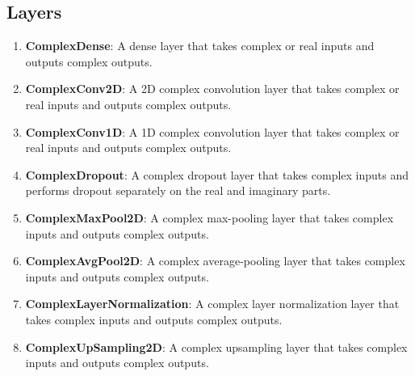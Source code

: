 \documentclass{article}
\begin{document}
\subsection{Layers}
\begin{enumerate}
  \item \textbf{ComplexDense}: A dense layer that takes complex or real inputs and outputs complex outputs.

  \item \textbf{ComplexConv2D}: A 2D complex convolution layer that takes complex or real inputs and outputs complex outputs.

  \item \textbf{ComplexConv1D}: A 1D complex convolution layer that takes complex or real inputs and outputs complex outputs.

  \item \textbf{ComplexDropout}: A complex dropout layer that takes complex inputs and performs dropout separately on the real and imaginary parts.

  \item \textbf{ComplexMaxPool2D}: A complex max-pooling layer that takes complex inputs and outputs complex outputs.

  \item \textbf{ComplexAvgPool2D}: A complex average-pooling layer that takes complex inputs and outputs complex outputs.

  \item \textbf{ComplexLayerNormalization}: A complex layer normalization layer that takes complex inputs and outputs complex outputs.

  \item \textbf{ComplexUpSampling2D}: A complex upsampling layer that takes complex inputs and outputs complex outputs.
\end{enumerate}
\end{document}
